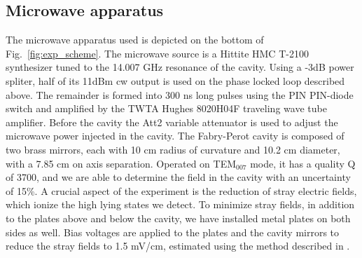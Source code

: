 \documentclass[pra, reprint]{revtex4-1}
\begin{document}
\subsection{Microwave apparatus}
\label{sec:microwave-setup}
The microwave apparatus used is depicted on the bottom of Fig.~\ref{fig:exp_scheme}. The microwave source is a Hittite HMC T-2100 synthesizer tuned to the 14.007 GHz resonance of the cavity. Using a -3dB power spliter, half of its 11dBm cw output is used on the phase locked loop described above. The remainder is formed into 300 ns long pulses using the PIN PIN-diode switch and amplified by the TWTA Hughes 8020H04F traveling wave tube amplifier. Before the cavity the Att2 variable attenuator is used to adjust the microwave power injected in the cavity. The Fabry-Perot cavity is composed of two brass mirrors, each with 10 cm radius of curvature and 10.2 cm diameter, with a 7.85 cm on axis separation. Operated on TEM$_{007}$ mode, it has a quality Q of 3700, and we are able to determine the field in the cavity with an uncertainty of 15\%. A crucial aspect of the experiment is the reduction of stray electric fields, which ionize the high lying states we detect. To minimize stray fields, in addition to the plates above and below the cavity, we have installed metal plates on both sides as well. Bias voltages are applied to the plates and the cavity mirrors to reduce the stray fields to 1.5 mV/cm, estimated using the method described in \cite{Gurian_2010}.


\end{document}
